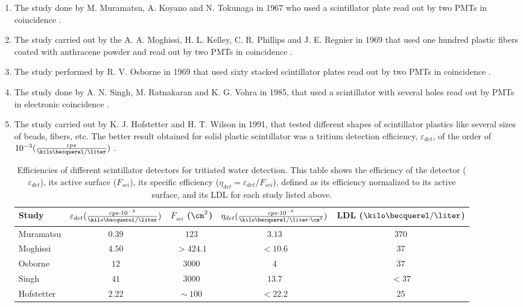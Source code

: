 \begin{enumerate}

\item{} The study done by M. Muramatsu, A. Koyano and N. Tokunaga in 1967 who used a scintillator plate read out by two PMTs in coincidence \cite{Muramatsu}.

\item{} The study carried out by the A. A. Moghissi, H. L. Kelley, C. R. Phillips and J. E. Regnier in 1969 that used one hundred plastic fibers coated with anthracene powder and read out by two PMTs in coincidence \cite{Moghissi}.

\item{} The study performed by R. V. Osborne in 1969 that used sixty stacked scintillator plates read out by two PMTs in coincidence \cite{Osborne}.

\item{} The study done by A. N. Singh, M. Ratnakaran and K. G. Vohra in 1985, that used a scintillator with several holes read out by PMTs in electronic coincidence \cite{Ratnakaran, Ratnakaran2000}.

\item{} The study carried out by K. J. Hofstetter and H. T. Wilson in 1991, that tested different shapes of scintillator plastics like several sizes of beads, fibers, etc. The better result obtained for solid plastic scintillator was a tritium detection efficiency, $\varepsilon_{det}$, of the order of $10^{-3}(\frac{cps}{\kilo\becquerel/\liter})$ \cite{Hofstetter1, Hofstetter2}.

\begin{table}[htbp]
\centering{}%
\begin{tabular}{lcccc}
\toprule 
Study & \parbox{5.5em}{$\varepsilon_{det}(\frac{cps \cdot{} 10^{-3}}{\kilo\becquerel/\liter})$}  & \parbox{4.5em}{$F_{sci}$ ($\cm^2$)}  & \parbox{6.5em}{$\eta_{det}(\frac{cps \cdot{} 10^{-6}}{\kilo\becquerel/ \liter \cdot{} \cm^2})$} & LDL ($\kilo\becquerel / \liter$) \tabularnewline
\midrule
\midrule 
Muramatsu & $0.39$ & $123$ & $3.13$ & $370$ \tabularnewline
Moghissi & $4.50$ & $>424.1$ & $<10.6$ & $37$ \tabularnewline
Osborne & $12$ & $3000$ & $4$ & $37$ \tabularnewline
Singh & $41$ & $3000$ & $13.7$ & $<37$ \tabularnewline
Hofstetter & $2.22$ & $\sim~100$ & $<22.2$ & $25$ \tabularnewline
\bottomrule
\end{tabular}
\caption{Efficiencies of different scintillator detectors for tritiated water detection. This table shows the efficiency of the detector ($\varepsilon_{det}$), its active surface ($F_{sci}$), its specific efficiency ($\eta_{det}=\varepsilon_{det}/F_{sci}$), defined as its efficiency normalized to its active surface, and its LDL for each study listed above.}
\label{tab:PlasticScinTritium}
\end{table}

\end{enumerate}

